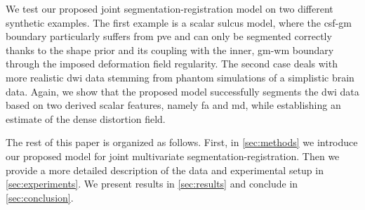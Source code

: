 We test our proposed joint segmentation-registration model on two different
synthetic examples.
The first example is a scalar sulcus model, where the
\gls{csf}-\gls{gm} boundary particularly suffers from \gls{pve} and can only be
segmented correctly thanks to the shape prior and its coupling with the inner,
\gls{gm}-\gls{wm} boundary through the imposed deformation field regularity.
The second case deals with more realistic \gls{dwi} data stemming from
phantom simulations of a simplistic brain data.
Again, we show that the
proposed model successfully segments the \gls{dwi} data based on two derived
scalar features, namely \gls{fa} and \gls{md}, while establishing an estimate
of the dense distortion field.

The rest of this paper is organized as follows.
First, in \autoref{sec:methods}
we introduce our proposed model for joint multivariate segmentation-registration.
Then we provide a more detailed description of the data and experimental setup in
\autoref{sec:experiments}.
We present results in \autoref{sec:results} and conclude
in \autoref{sec:conclusion}.